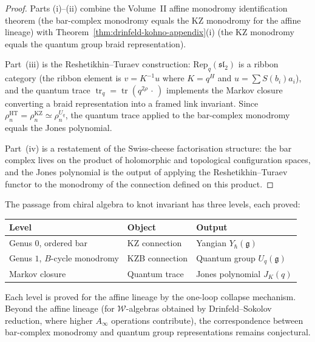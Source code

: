 \begin{proof}
Parts (i)--(ii) combine the Volume~II affine monodromy identification
theorem (the bar-complex monodromy equals the KZ monodromy for the affine
lineage) with Theorem~\ref{thm:drinfeld-kohno-appendix}(i) (the KZ monodromy
equals the quantum group braid representation).

Part~(iii) is the Reshetikhin--Turaev construction: $\mathrm{Rep}_q(\mathfrak{sl}_2)$
is a ribbon category (the ribbon element is $v = K^{-1}u$ where
$K = q^H$ and $u = \sum S(b_i)a_i$), and the quantum trace
$\operatorname{tr}_q = \operatorname{tr}(q^{2\rho} \,\cdot\,)$
implements the Markov closure converting a braid representation into a
framed link invariant. Since $\rho_n^{\mathrm{HT}} = \rho_n^{\mathrm{KZ}}
\simeq \rho_n^{U_q}$, the quantum trace applied to the bar-complex
monodromy equals the Jones polynomial.

Part~(iv) is a restatement of the Swiss-cheese factorisation
structure: the bar complex lives on the product of holomorphic and
topological configuration spaces, and the Jones polynomial is the
output of applying the Reshetikhin--Turaev functor to the monodromy of
the connection defined on this product.
\end{proof}

\begin{remark}
\label{rem:three-levels}
The passage from chiral algebra to knot invariant has three levels,
each proved:
\begin{center}
\renewcommand{\arraystretch}{1.3}
\begin{tabular}{lll}
\textbf{Level} & \textbf{Object} & \textbf{Output} \\
\hline
Genus $0$, ordered bar & KZ connection & Yangian $Y_\hbar(\mathfrak{g})$ \\
Genus $1$, $B$-cycle monodromy & KZB connection & Quantum group $U_q(\mathfrak{g})$ \\
Markov closure & Quantum trace & Jones polynomial $J_K(q)$ \\
\end{tabular}
\end{center}
Each level is proved for the affine lineage by the one-loop collapse
mechanism. Beyond the affine lineage (for $\mathcal{W}$-algebras
obtained by Drinfeld--Sokolov reduction, where higher $A_\infty$
operations contribute), the correspondence between bar-complex
monodromy and quantum group representations remains conjectural.
\end{remark}

